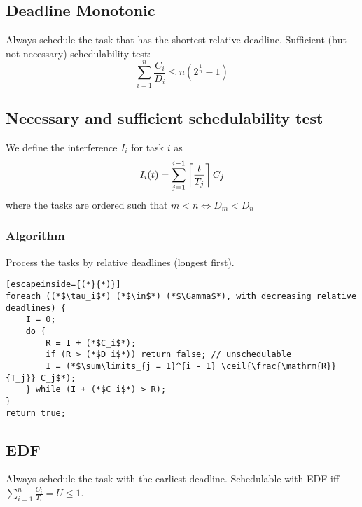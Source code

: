 \subsection{Deadline Monotonic}
Always schedule the task that has the shortest relative deadline.
Sufficient (but not necessary) schedulability test:
\begin{equation*}
	\sum_{i = 1}^n \frac{C_i}{D_i} \leq n \left( 2^{\frac{1}{n}} - 1 \right)
\end{equation*}

\subsection{Necessary and sufficient schedulability test}
We define the interference $I_i$ for task $i$ as
\begin{equation*}
	I_i(t) = \sum_{j = 1}^{i - 1} \left\lceil \frac{t}{T_j} \right\rceil C_j
\end{equation*}
where the tasks are ordered such that $m < n \iff D_m < D_n$

\subsubsection{Algorithm}
Process the tasks by relative deadlines (longest first).
\begin{lstlisting}[escapeinside={(*}{*)}]
foreach ((*$\tau_i$*) (*$\in$*) (*$\Gamma$*), with decreasing relative deadlines) {
	I = 0;
	do {
		R = I + (*$C_i$*);
		if (R > (*$D_i$*)) return false; // unschedulable
		I = (*$\sum\limits_{j = 1}^{i - 1} \ceil{\frac{\mathrm{R}}{T_j}} C_j$*);
	} while (I + (*$C_i$*) > R);
}
return true;
\end{lstlisting}

\subsection{EDF}
Always schedule the task with the earliest deadline.
Schedulable with EDF iff $\sum\limits_{i = 1}^{n} \frac{C_i}{T_i} = U \leq 1$.
